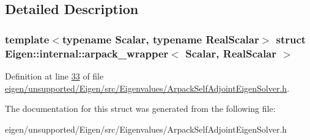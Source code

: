 \subsection{Detailed Description}
\subsubsection*{template$<$typename Scalar, typename Real\+Scalar$>$\newline
struct Eigen\+::internal\+::arpack\+\_\+wrapper$<$ Scalar, Real\+Scalar $>$}



Definition at line \hyperlink{eigen_2unsupported_2_eigen_2src_2_eigenvalues_2_arpack_self_adjoint_eigen_solver_8h_source_l00033}{33} of file \hyperlink{eigen_2unsupported_2_eigen_2src_2_eigenvalues_2_arpack_self_adjoint_eigen_solver_8h_source}{eigen/unsupported/\+Eigen/src/\+Eigenvalues/\+Arpack\+Self\+Adjoint\+Eigen\+Solver.\+h}.



The documentation for this struct was generated from the following file\+:\begin{DoxyCompactItemize}
\item 
eigen/unsupported/\+Eigen/src/\+Eigenvalues/\+Arpack\+Self\+Adjoint\+Eigen\+Solver.\+h\end{DoxyCompactItemize}
